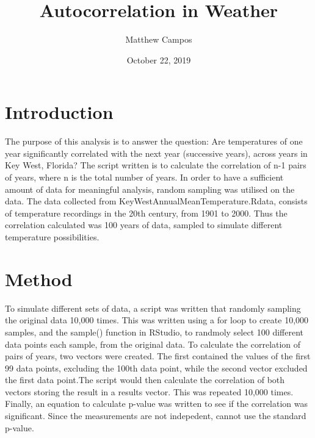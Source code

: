 \documentclass[12pt]{article}
\title{Autocorrelation in Weather}
\author{Matthew Campos}
\date{October 22, 2019}
\begin{document}
    \maketitle

    \section{Introduction}
    The purpose of this analysis is to answer the question:  Are temperatures of one year significantly correlated with the next year (successive years), across years in Key West, Florida? The script written is to calculate the correlation of n-1 pairs of years, where n is the total number of years. In order to have a sufficient amount of data for meaningful analysis, random sampling was utilised on the data. The data collected from KeyWestAnnualMeanTemperature.Rdata, consists of temperature recordings in the 20th century, from 1901 to 2000. Thus the correlation calculated was 100 years of data, sampled to simulate different temperature possibilities.

    \section{Method}
    To simulate different sets of data, a script was written that randomly sampling the original data 10,000 times. This was written using a for loop to create 10,000 samples, and the sample() function in RStudio, to randmoly select 100 different data points each sample, from the original data. To calculate the correlation of pairs of years, two vectors were created. The first contained the values of the first 99 data points, excluding the 100th data point, while the second vector excluded the first data point.The script would then calculate the correlation of both vectors storing the result in a results vector. This was repeated 10,000 times. Finally, an equation to calculate p-value was written to see if the correlation was significant. Since the measurements are not indepedent, cannot use the standard p-value.
\end{document}
